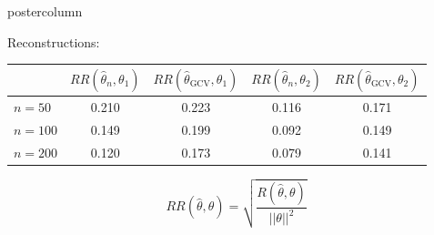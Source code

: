 \documentclass[final]{beamer}
\begin{document}
\begin{frame}
\begin{columns}
\begin{column}{.32\textwidth}
\begin{beamercolorbox}[center,wd=\textwidth]{postercolumn}
\begin{minipage}[T]{.95\textwidth}
{\begin{block}{Reconstructions:}
              \begin{table}[!h]
                \begin{tabular}{l|cc|cc}
                  & $RR(\hat\theta_n,\theta_1)$ & $RR(\hat\theta_{\text{GCV}},\theta_1)$
                  & $RR(\hat\theta_n,\theta_2)$ & $RR(\hat\theta_{\text{GCV}},\theta_2)$ \\
                  \hline
                  $n = 50$             & 0.210              & 0.223       & 0.116              & 0.171 \\
                  $n = 100$             & 0.149              & 0.199       & 0.092              & 0.149 \\
                  $n = 200$             & 0.120              & 0.173       & 0.079              & 0.141   
                \end{tabular} 
              \end{table}
              \[
              RR(\hat\theta,\theta) = \sqrt{\frac{R(\hat \theta,\theta)}{||\theta||^2}}
              \]
            \end{block}
          \vfill
          }
        \end{minipage}
      \end{beamercolorbox}
    \end{column}
  \end{columns}
\end{frame}
\end{document}
